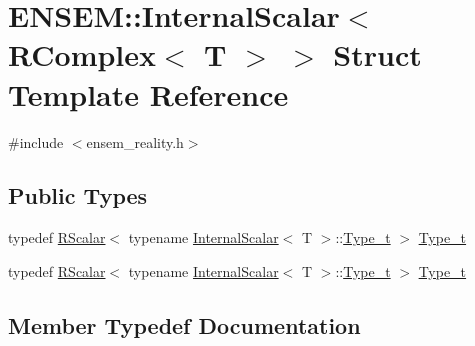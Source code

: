 \hypertarget{structENSEM_1_1InternalScalar_3_01RComplex_3_01T_01_4_01_4}{}\section{E\+N\+S\+EM\+:\+:Internal\+Scalar$<$ R\+Complex$<$ T $>$ $>$ Struct Template Reference}
\label{structENSEM_1_1InternalScalar_3_01RComplex_3_01T_01_4_01_4}


{\ttfamily \#include $<$ensem\+\_\+reality.\+h$>$}

\subsection*{Public Types}
\begin{DoxyCompactItemize}
\item 
typedef \mbox{\hyperlink{classENSEM_1_1RScalar}{R\+Scalar}}$<$ typename \mbox{\hyperlink{structENSEM_1_1InternalScalar}{Internal\+Scalar}}$<$ T $>$\+::\mbox{\hyperlink{structENSEM_1_1InternalScalar_3_01RComplex_3_01T_01_4_01_4_ae83e499664d5d34d7a1271f9151f4ab0}{Type\+\_\+t}} $>$ \mbox{\hyperlink{structENSEM_1_1InternalScalar_3_01RComplex_3_01T_01_4_01_4_ae83e499664d5d34d7a1271f9151f4ab0}{Type\+\_\+t}}
\item 
typedef \mbox{\hyperlink{classENSEM_1_1RScalar}{R\+Scalar}}$<$ typename \mbox{\hyperlink{structENSEM_1_1InternalScalar}{Internal\+Scalar}}$<$ T $>$\+::\mbox{\hyperlink{structENSEM_1_1InternalScalar_3_01RComplex_3_01T_01_4_01_4_ae83e499664d5d34d7a1271f9151f4ab0}{Type\+\_\+t}} $>$ \mbox{\hyperlink{structENSEM_1_1InternalScalar_3_01RComplex_3_01T_01_4_01_4_ae83e499664d5d34d7a1271f9151f4ab0}{Type\+\_\+t}}
\end{DoxyCompactItemize}


\subsection{Member Typedef Documentation}
\mbox{\label{structENSEM_1_1InternalScalar_3_01RComplex_3_01T_01_4_01_4_ae83e499664d5d34d7a1271f9151f4ab0}} 
